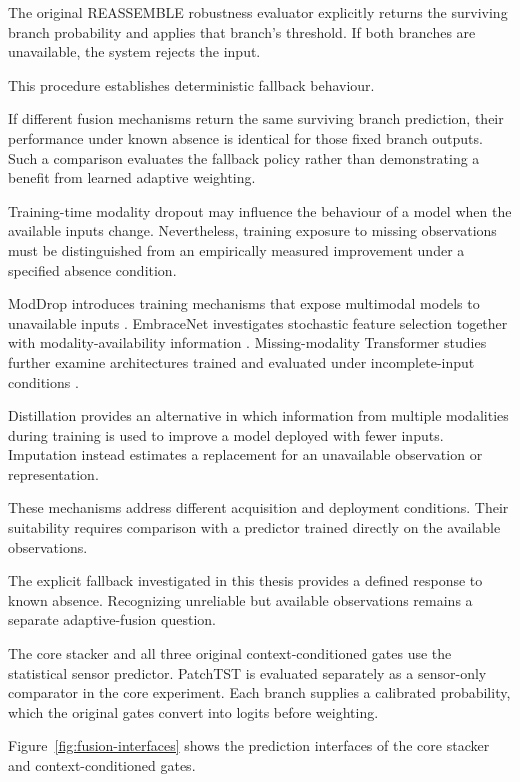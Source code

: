 The original REASSEMBLE robustness evaluator explicitly returns the surviving branch probability and applies that branch’s threshold. If both branches are unavailable, the system rejects the input.

This procedure establishes deterministic fallback behaviour.

If different fusion mechanisms return the same surviving branch prediction, their performance under known absence is identical for those fixed branch outputs. Such a comparison evaluates the fallback policy rather than demonstrating a benefit from learned adaptive weighting.

Training-time modality dropout may influence the behaviour of a model when the available inputs change. Nevertheless, training exposure to missing observations must be distinguished from an empirically measured improvement under a specified absence condition.

ModDrop introduces training mechanisms that expose multimodal models to unavailable inputs \parencite{P005}. EmbraceNet investigates stochastic feature selection together with modality-availability information \parencite{P007}. Missing-modality Transformer studies further examine architectures trained and evaluated under incomplete-input conditions \parencite{P016}.

Distillation provides an alternative in which information from multiple modalities during training is used to improve a model deployed with fewer inputs. Imputation instead estimates a replacement for an unavailable observation or representation.

These mechanisms address different acquisition and deployment conditions. Their suitability requires comparison with a predictor trained directly on the available observations.

The explicit fallback investigated in this thesis provides a defined response to known absence. Recognizing unreliable but available observations remains a separate adaptive-fusion question.

The core stacker and all three original context-conditioned gates use the statistical sensor predictor. PatchTST is evaluated separately as a sensor-only comparator in the core experiment. Each branch supplies a calibrated probability, which the original gates convert into logits before weighting.

Figure~\ref{fig:fusion-interfaces} shows the prediction interfaces of the core stacker and context-conditioned gates.

